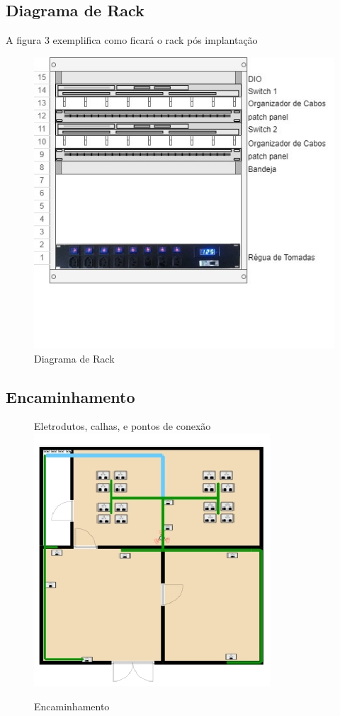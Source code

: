 \documentclass[	DIV=calc,%
							paper=a4,%
							fontsize=12pt,%
							onecolumn]{scrartcl}	 					%
\begin{document}
\subsection{Diagrama de Rack}
	A figura 3 exemplifica como ficará o rack pós implantação
	\begin{figure}[H]
	\centering
	\includegraphics[scale=1]{fig3}
	\caption{Diagrama de Rack}
	\label{fig3}
	\end{figure}

\subsection{Encaminhamento}
\begin{figure}[H]
	Eletrodutos, calhas, e pontos de conexão
	\centering
	\includegraphics[scale=1.5]{fig4}
	\caption{Encaminhamento}
	\label{fig4}
	\end{figure}
	
\end{document}
